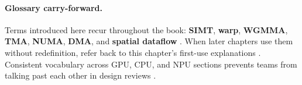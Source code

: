 \paragraph{Glossary carry-forward.}
Terms introduced here recur throughout the book: \textbf{SIMT}, \textbf{warp}, \textbf{WGMMA}, \textbf{TMA}, \textbf{NUMA}, \textbf{DMA}, and \textbf{spatial dataflow} \citep{nvidia2022hopper,amd2024xdna,dlbook}.
When later chapters use them without redefinition, refer back to this chapter's first-use explanations \citep{yirage2026}.
Consistent vocabulary across GPU, CPU, and NPU sections prevents teams from talking past each other in design reviews \citep{patel2025llminference,chen2020compilerbasedhardw}.

